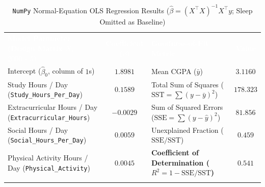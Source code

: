 \documentclass[11pt,a4paper]{article}
\newcommand{\hd}[1]{\textcolor{white}{\textbf{#1}}}
\renewcommand{\arraystretch}{1.04}
\begin{document}
\begin{table}[!htbp]
\centering
\caption{\texttt{NumPy} Normal-Equation OLS Regression Results ($\hat{\beta} = (X^\top X)^{-1} X^\top y$; Sleep Omitted as Baseline)}
\label{tab:ols}
\scriptsize
\renewcommand{\arraystretch}{1.08}
\setlength{\tabcolsep}{5pt}
\begin{tabularx}{\textwidth}{>{\raggedright\arraybackslash}X c !{\color{accent}\vrule width 0.8pt} >{\raggedright\arraybackslash}X c}
\toprule[1.2pt]
\hd{Model Parameter (Design Matrix $X$, $2000 \times 5$)} & \hd{Coefficient ($\hat{\beta}$)} & \hd{Goodness-of-Fit Metric} & \hd{Value} \\
\midrule
Intercept ($\hat{\beta}_0$, column of $1$s) & $1.8981$ & Mean CGPA ($\bar{y}$) & $3.1160$ \\
Study Hours / Day (\texttt{Study\_Hours\_Per\_Day}) & $\mathbf{0.1589}$ & Total Sum of Squares ($\text{SST} = \sum (y - \bar{y})^2$) & $178.323$ \\
Extracurricular Hours / Day (\texttt{Extracurricular\_Hours}) & $-0.0029$ & Sum of Squared Errors ($\text{SSE} = \sum (y - \hat{y})^2$) & $81.856$ \\
Social Hours / Day (\texttt{Social\_Hours\_Per\_Day}) & $0.0059$ & Unexplained Fraction ($\text{SSE} / \text{SST}$) & $0.459$ \\
Physical Activity Hours / Day (\texttt{Physical\_Activity}) & $0.0045$ & \textbf{Coefficient of Determination ($R^2 = 1 - \text{SSE}/\text{SST}$)} & $\mathbf{0.541}$ \\
\bottomrule[1.2pt]
\end{tabularx}
\end{table}
\end{document}

